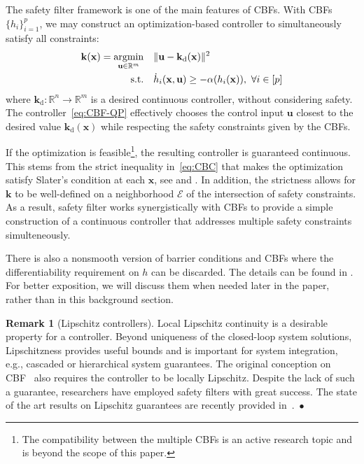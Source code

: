 \documentclass[10pt,twocolumn,twoside]{IEEEtran}
\newcommand{\real}{\mathbb{R}}
\newcommand{\until}[1]{[#1]}
\newcommand{\map}[3]{#1:#2 \rightarrow #3}
\newcommand{\Ec}{\mathcal{E}}
\theoremstyle{definition}
\newtheorem{remark}{Remark}
\newcommand{\bk}{\mathbf{k}}
\newcommand{\bu}{\mathbf{u}}
\newcommand{\bx}{\mathbf{x}}
\newcommand{\des}{{\operatorname{d}}}
\DeclareMathOperator*{\argmin}{argmin}
\begin{document}
The safety filter framework is one of the main features of CBFs. With CBFs $\{h_i\}_{i=1}^p$, we may construct an optimization-based controller to simultaneously satisfy all constraints:
\begin{align}\label{eq:CBF-QP}
    \bk(\bx)  =\argmin_{\bu\in\real^m} \quad & \|\bu-\bk_\des(\bx)\|^2                                                                  \\
             \textup{s.t.} \quad & \dot h_i(\bx,\bu) \geq -\alpha(h_i(\bx)),~\forall i\in\until{p} \nonumber
\end{align}
where $\map{\bk_\des}{\real^n}{\real^m}$ is a desired continuous controller, without considering safety. The controller~\eqref{eq:CBF-QP} effectively chooses the control input $\bu$ closest to the desired value $\bk_\des(\bx)$ while respecting the safety constraints given by the CBFs.


If the optimization is feasible\footnote{The compatibility between the multiple CBFs is an active research topic and is beyond the scope of this paper.}, the resulting controller is guaranteed continuous. This stems from the strict inequality in~\eqref{eq:CBC} that makes the optimization satisfy Slater's condition at each $\bx$, see \cite[Prop. 2.19]{RAF-PVK:96} and \cite{PM-AA-JC:25}. In addition, the strictness allows for $\bk$ to be well-defined on a neighborhood $\Ec$ of the intersection of safety constraints. As a result, safety filter works synergistically with CBFs to provide a simple construction of a continuous controller that addresses multiple safety constraints simulteneously.

There is also a nonsmooth version of barrier conditions and CBFs where the differentiability requirement on $h$ can be discarded. The details can be found in \cite{PG-JC-ME:17}. For better exposition, we will discuss them when needed later in the paper, rather than in this background section.

\begin{remark}[Lipschitz controllers]
    Local Lipschitz continuity is a desirable property for a controller. Beyond uniqueness of the closed-loop system solutions, Lipschitzness provides useful bounds and is important for system integration, e.g., cascaded or hierarchical system guarantees. The original conception on CBF~\cite{ADA-SC-ME-GN-KS-PT:19} also requires the controller to be locally Lipschitz. Despite the lack of such a guarantee, researchers have employed safety filters with great success. The state of the art results on Lipschitz guarantees are recently provided in~\cite{PM-AA-JC:25}.~\hfill$\bullet$
\end{remark}
\end{document}
